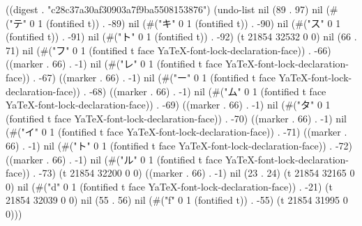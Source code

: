 
((digest . "c28c37a30af30903a7f9ba5508153876") (undo-list nil (89 . 97) nil (#("テ" 0 1 (fontified t)) . -89) nil (#("キ" 0 1 (fontified t)) . -90) nil (#("ス" 0 1 (fontified t)) . -91) nil (#("ト" 0 1 (fontified t)) . -92) (t 21854 32532 0 0) nil (66 . 71) nil (#("フ" 0 1 (fontified t face YaTeX-font-lock-declaration-face)) . -66) ((marker . 66) . -1) nil (#("レ" 0 1 (fontified t face YaTeX-font-lock-declaration-face)) . -67) ((marker . 66) . -1) nil (#("ー" 0 1 (fontified t face YaTeX-font-lock-declaration-face)) . -68) ((marker . 66) . -1) nil (#("ム" 0 1 (fontified t face YaTeX-font-lock-declaration-face)) . -69) ((marker . 66) . -1) nil (#("タ" 0 1 (fontified t face YaTeX-font-lock-declaration-face)) . -70) ((marker . 66) . -1) nil (#("イ" 0 1 (fontified t face YaTeX-font-lock-declaration-face)) . -71) ((marker . 66) . -1) nil (#("ト" 0 1 (fontified t face YaTeX-font-lock-declaration-face)) . -72) ((marker . 66) . -1) nil (#("ル" 0 1 (fontified t face YaTeX-font-lock-declaration-face)) . -73) (t 21854 32200 0 0) ((marker . 66) . -1) nil (23 . 24) (t 21854 32165 0 0) nil (#("d" 0 1 (fontified t face YaTeX-font-lock-declaration-face)) . -21) (t 21854 32039 0 0) nil (55 . 56) nil (#("f" 0 1 (fontified t)) . -55) (t 21854 31995 0 0)))

